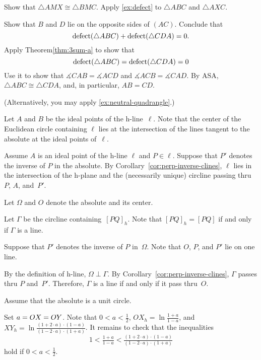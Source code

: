 Show that $\triangle AMX\cong \triangle BMC$. 
Apply \ref{ex:defect} to $\triangle ABC$ and $\triangle AXC$.


Show that $B$ and $D$ lie on the opposite sides of $(AC)$.
Conclude that 
\[\mathop{\rm defect}\nolimits(\triangle ABC)+\mathop{\rm defect}\nolimits(\triangle CDA)=0.\]
Apply Theorem\ref{thm:3sum-a} to show that 
\[\mathop{\rm defect}\nolimits(\triangle ABC)=\mathop{\rm defect}\nolimits(\triangle CDA)=0\]
Use it to show that $\measuredangle CAB=\measuredangle ACD$ and $\measuredangle ACB=\measuredangle CAD$.
By ASA, $\triangle ABC\cong\triangle CDA$, and, in particular, $AB=CD$.

(Alternatively, you may apply \ref{ex:neutral-quadrangle}.)

\setcounter{eqtn}{0}

Let $A$ and $B$ be the ideal points of the h-line~$\ell$. 
Note that the center of the Euclidean circle containing $\ell$ lies 
at the intersection of the lines tangent to the absolute at the ideal points of~$\ell$.

Assume $A$ is an ideal point of the h-line $\ell$
and $P\in \ell$.
Suppose that $P'$ denotes the inverse of $P$ in the absolute.
By Corollary~\ref{cor:perp-inverse-clines},
$\ell$ lies in the intersection of the h-plane and the (necessarily unique) circline 
passing thru $P$, $A$, and~$P'$.

Let $\Omega$ and $O$ denote the absolute and its center. 

Let $\Gamma$ be the circline containing~$[PQ]_h$.
Note that $[PQ]_h=[PQ]$ if and only if $\Gamma$ is a line.

Suppose that $P'$ denotes the inverse of $P$ in~$\Omega$.
Note that $O$, $P$, and $P'$ lie on one line.

By the definition of h-line, $\Omega\perp \Gamma$.
By Corollary~\ref{cor:perp-inverse-clines}, $\Gamma$ passes thru $P$ and~$P'$. 
Therefore, $\Gamma$
is a line if and only if it pass thru~$O$.

Assume that the absolute is a unit circle.

Set $a\z=OX\z=OY$.
Note that $0<a<\tfrac12$,
$
OX_h=\ln \tfrac{1+a}{1-a}$,
and
$XY_h=\ln \tfrac{(1+2\cdot a)\cdot(1-a)}{(1-2\cdot a)\cdot(1+a)}$.
It remains to check that the inequalities 
\[1<
\tfrac{1+a}{1-a}
<
\tfrac{(1+2\cdot a)\cdot(1-a)}{(1-2\cdot a)\cdot(1+a)}\]
hold if $0<a<\tfrac12$.

